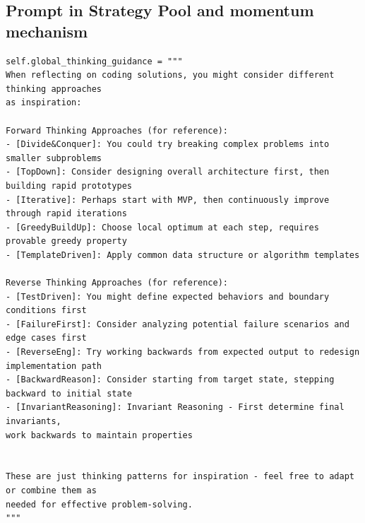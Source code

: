\documentclass[11pt]{article}
\theoremstyle{definition}
\theoremstyle{remark}
\begin{document}
\subsection{Prompt in Strategy Pool and momentum mechanism}
\begin{tcolorbox}[notitle, sharp corners, breakable, colframe=ForestGreen, colback=white, 
       boxrule=3pt, boxsep=0.5pt, enhanced, 
       shadow={3pt}{-3pt}{0pt}{opacity=1,mygrey},
       title={Global Thinking Guidance},]\label{box:global-thinking-guidance}
       \scriptsize
       {\selectfont
\begin{lstlisting}
self.global_thinking_guidance = """
When reflecting on coding solutions, you might consider different thinking approaches 
as inspiration:

Forward Thinking Approaches (for reference):
- [Divide&Conquer]: You could try breaking complex problems into smaller subproblems
- [TopDown]: Consider designing overall architecture first, then building rapid prototypes  
- [Iterative]: Perhaps start with MVP, then continuously improve through rapid iterations
- [GreedyBuildUp]: Choose local optimum at each step, requires provable greedy property
- [TemplateDriven]: Apply common data structure or algorithm templates

Reverse Thinking Approaches (for reference):
- [TestDriven]: You might define expected behaviors and boundary conditions first
- [FailureFirst]: Consider analyzing potential failure scenarios and edge cases first
- [ReverseEng]: Try working backwards from expected output to redesign implementation path
- [BackwardReason]: Consider starting from target state, stepping backward to initial state
- [InvariantReasoning]: Invariant Reasoning - First determine final invariants, 
work backwards to maintain properties


These are just thinking patterns for inspiration - feel free to adapt or combine them as 
needed for effective problem-solving.
"""
\end{lstlisting}
}
\end{tcolorbox}
\end{document}
